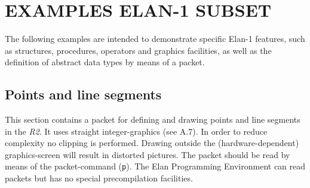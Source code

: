 \chapter{EXAMPLES ELAN-1 SUBSET}

The following examples are intended to demonstrate specific Elan-1
features, such as structures, procedures, operators and
graphics facilities, as well as the definition of
abstract data types by means of a packet.

\section{Points and line segments}

This section contains a packet for defining and drawing points
and line segments in the {\em R2}.
It uses straight integer-graphics (see A.7).
In order to reduce complexity no clipping is performed.
Drawing outside the (hardware-dependent) graphics-screen will result
in distorted pictures.
The packet should be read by means of the packet-command ({\tt p}).
The Elan Programming Environment can read packets but has no special
precompilation facilities.

